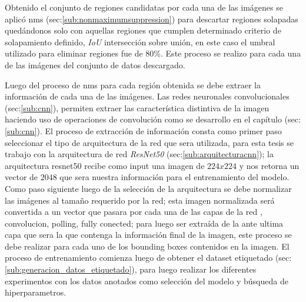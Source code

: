 Obtenido el conjunto de regiones candidatas por cada una de las imágenes se aplicó \ac{nms} (sec:\ref{sub:nonmaximumsuppression}) para descartar regiones solapadas quedándonos solo con aquellas regiones que cumplen determinado criterio de solapamiento definido, \textit{IoU} intersección sobre unión, en este caso el umbral utilizado para eliminar regiones fue de 80\%. Este proceso se realizo para cada una de las imágenes del conjunto de datos descargado.


Luego del proceso de \ac{nms} para cada región obtenida se debe extraer la información de cada una de las imágenes. Las redes neuronales convolucionales (sec:\ref{sub:cnn}), permiten extraer las característica distintiva de la imagen haciendo uso de operaciones de convolución como se desarrollo en el capítulo (sec:\ref{sub:cnn}). El proceso de extracción de información consta como primer paso seleccionar el tipo de arquitectura de la red que sera utilizada, para esta tesis se trabajo con la arquitectura de red \textit{ResNet50} (sec:\ref{sub:arquitecturacnn}); la arquitectura  resnet50 recibe como input una imagen de $224 x 224$ y nos retorna un vector de $2048$ que sera nuestra información para el entrenamiento del modelo.
Como paso siguiente luego de la selección de la arquitectura se debe normalizar las imágenes al tamaño requerido por la red; esta imagen normalizada será convertida a un vector que pasara por cada una de las capas de la red , convolucion, polling, fully conected; para luego ser extraída de la ante ultima capa que sera la que contenga la información final de la imagen, este proceso se debe realizar para cada uno de los bounding boxes contenidos en la imagen. El proceso de entrenamiento comienza luego de obtener el dataset etiquetado (sec: \ref{sub:generacion_datos_etiquetado}), para luego realizar los diferentes experimentos con los datos anotados como selección del modelo y búsqueda de hiperparametros.




